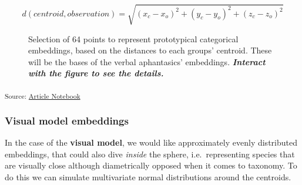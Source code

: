 \documentclass[
  authoryear]{elsarticle}
\begin{document}
\[d(centroid, observation) = \sqrt{(x_{c} - x_{o})^{2} + (y_{c} - y_{o})^{2} + (z_{c} - z_{o})^{2}}\]

\label{cell-fig-categorical-embeddings}
\begin{figure}[H]


\caption{\label{fig-categorical-embeddings}Selection of 64 points to
represent prototypical categorical embeddings, based on the distances to
each groups' centroid. These will be the bases of the verbal
aphantasics' embeddings. \textbf{\emph{Interact with the figure to see
the details.}}}

\end{figure}%

\textsubscript{Source:
\href{https://m-delem.github.io/2499-similarity-manuscript/index.qmd.html}{Article
Notebook}}

\subsubsection{Visual model embeddings}\label{visual-model-embeddings}

In the case of the \textbf{visual model}, we would like approximately
evenly distributed embeddings, that could also dive \emph{inside} the
sphere, i.e.~representing species that are visually close although
diametrically opposed when it comes to taxonomy. To do this we can
simulate multivariate normal distributions around the centroids.
\end{document}
